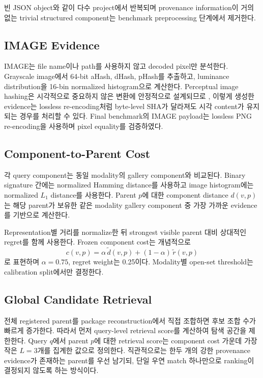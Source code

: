 \documentclass[runningheads]{llncs}
\begin{document}
빈 JSON object와 같이 다수 project에서 반복되며 provenance information이 거의 없는 trivial structured component는 benchmark preprocessing 단계에서 제거한다.

\subsection{IMAGE Evidence}

IMAGE는 file name이나 path를 사용하지 않고 decoded pixel만 분석한다. Grayscale image에서 64-bit aHash, dHash, pHash를 추출하고, luminance distribution을 16-bin normalized histogram으로 계산한다. Perceptual image hashing은 시각적으로 중요하지 않은 변환에 안정적으로 설계되므로 \cite{monga2006perceptual}, 이렇게 생성한 evidence는 lossless re-encoding처럼 byte-level SHA가 달라져도 시각 content가 유지되는 경우를 처리할 수 있다. Final benchmark의 IMAGE payload는 lossless PNG re-encoding을 사용하며 pixel equality를 검증하였다.

\subsection{Component-to-Parent Cost}

각 query component는 동일 modality의 gallery component와 비교된다. Binary signature 간에는 normalized Hamming distance를 사용하고 image histogram에는 normalized \(L_1\) distance를 사용한다. Parent \(p\)에 대한 component distance \(d(v,p)\)는 해당 parent가 보유한 같은 modality gallery component 중 가장 가까운 evidence를 기반으로 계산한다.

Representation별 거리를 normalize한 뒤 strongest visible parent 대비 상대적인 regret를 함께 사용한다. Frozen component cost는 개념적으로
\[
c(v,p)=\alpha\,\tilde d(v,p)+(1-\alpha)\,\tilde r(v,p)
\]
로 표현하며 \(\alpha=0.75\), regret weight는 0.25이다. Modality별 open-set threshold는 calibration split에서만 결정한다.

\subsection{Global Candidate Retrieval}

전체 registered parent를 package reconstruction에서 직접 조합하면 후보 조합 수가 빠르게 증가한다. 따라서 먼저 query-level retrieval score를 계산하여 탐색 공간을 제한한다. Query $q$에서 parent $p$에 대한 retrieval score는 component cost 가운데 가장 작은 $L=3$개를 집계한 값으로 정의한다. 직관적으로는 한두 개의 강한 provenance evidence가 존재하는 parent를 우선 남기되, 단일 우연 match 하나만으로 ranking이 결정되지 않도록 하는 방식이다.
\end{document}
